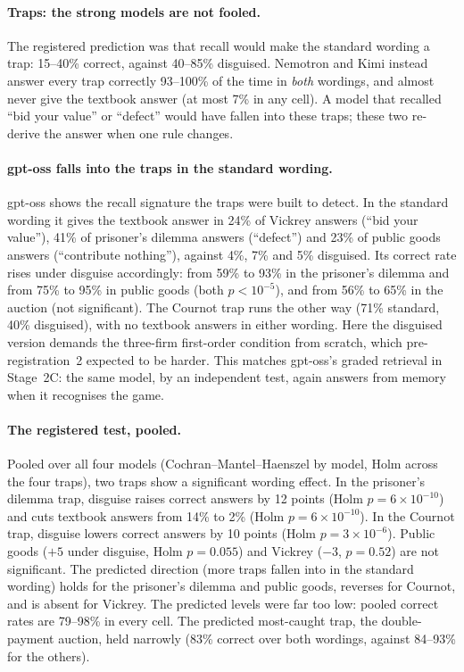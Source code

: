 \documentclass[10pt]{article}
\theoremstyle{definition}
\theoremstyle{remark}
\begin{document}
\paragraph{Traps: the strong models are not fooled.} The registered prediction was that
recall would make the standard wording a trap: 15--40\% correct, against 40--85\% disguised.
Nemotron and Kimi instead answer every trap correctly 93--100\% of the time in \emph{both}
wordings, and almost never give the textbook answer (at most 7\% in any cell). A model that
recalled ``bid your value'' or ``defect'' would have fallen into these traps; these two
re-derive the answer when one rule changes.

\paragraph{gpt-oss falls into the traps in the standard wording.} gpt-oss shows the recall
signature the traps were built to detect. In the standard wording it gives the textbook answer in
24\% of Vickrey answers (``bid your value''), 41\% of prisoner's dilemma answers (``defect'') and
23\% of public goods answers (``contribute nothing''), against 4\%, 7\% and 5\% disguised. Its
correct rate rises under disguise accordingly: from 59\% to 93\% in the prisoner's dilemma and
from 75\% to 95\% in public goods (both $p<10^{-5}$), and from 56\% to 65\% in the auction
(not significant). The Cournot trap runs the other way (71\% standard, 40\% disguised), with no
textbook answers in either wording. Here the disguised version demands the three-firm
first-order condition from scratch, which pre-registration~2 expected to be harder. This
matches gpt-oss's graded retrieval in Stage~2C: the same model, by an independent test, again
answers from memory when it recognises the game.

\paragraph{The registered test, pooled.} Pooled over all four models (Cochran--Mantel--Haenszel
by model, Holm across the four traps), two traps show a significant wording effect. In the
prisoner's dilemma trap, disguise raises correct answers by 12 points (Holm $p=6\times10^{-10}$)
and cuts textbook answers from 14\% to 2\% (Holm $p=6\times10^{-10}$). In the Cournot trap,
disguise lowers correct answers by 10 points (Holm $p=3\times10^{-6}$). Public goods ($+5$ under disguise, Holm
$p=0.055$) and Vickrey ($-3$, $p=0.52$) are not significant. The predicted direction (more
traps fallen into in the standard wording) holds for the prisoner's dilemma and public goods,
reverses for Cournot, and is absent for Vickrey. The predicted levels were far too low: pooled
correct rates are 79--98\% in every cell. The predicted most-caught trap, the double-payment
auction, held narrowly (83\% correct over both wordings, against 84--93\% for the others).
\end{document}
